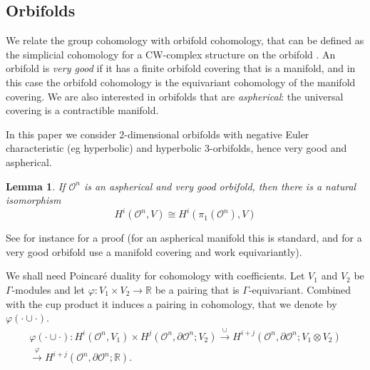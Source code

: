 \documentclass[a4paper,11pt]{article}
\newtheorem{Lemma}[Theorem]{Lemma}
\begin{document}
 
 \subsection{Orbifolds}



We relate the group cohomology with orbifold cohomology, that can be defined as the simplicial cohomology
for a CW-complex structure on the orbifold \cite[\S3]{PortiDim}. 
An orbifold is \emph{very good} if it has a finite orbifold covering that is 
a manifold, and in this case the orbifold cohomology is the equivariant cohomology of the manifold
covering.
We are also interested in orbifolds that are \emph{aspherical}:
the universal covering is a contractible manifold. 

In this paper we consider 2-dimensional orbifolds with negative Euler characteristic (eg hyperbolic) and
hyperbolic 3-orbifolds, hence very good and aspherical. 


\begin{Lemma} If $\mathcal O^n$ is an aspherical and very good orbifold, then there is a natural isomorphism
$$
H^i(\mathcal O^n, V)\cong H^i(\pi_1(\mathcal O^n), V)
$$
\end{Lemma}

See for instance \cite[Prop.~3.4]{PortiDim} for a proof (for an aspherical manifold this is standard, and for
a very good orbifold use a manifold covering and work equivariantly).






We shall need  Poincar\'e duality for cohomology with coefficients. Let $V_1$ and $V_2$ be $\Gamma$-modules and 
let $\varphi\colon V_1\times V_2\to \mathbb R$ be a  pairing that is $\Gamma$-equivariant. 
Combined with the cup product it induces a pairing
in cohomology, that we denote by $\varphi(\cdot\cup\cdot)$.
\begin{multline*} \varphi(\cdot\cup\cdot)\colon
 H^i(\mathcal O^n, V_1)\times 
 H^{j}(\mathcal O^n, \partial \mathcal O^n; V_2)\overset\cup\to 
 H^{i+j}(\mathcal O^n, \partial \mathcal O^n; V_1\otimes V_2 )
 \\
 \overset\varphi\to 
 H^{i+j}(\mathcal O^n, \partial \mathcal O^n; \mathbb R).
\end{multline*}
\end{document}
